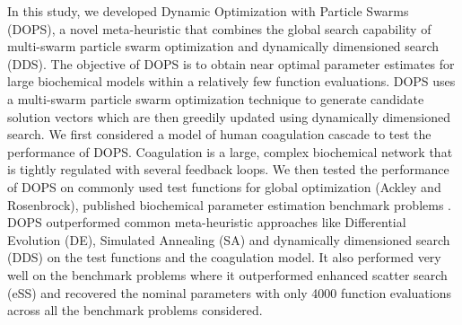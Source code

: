 \documentclass[12pt]{article}
\begin{document}
In this study, we developed Dynamic Optimization with Particle Swarms (DOPS), a novel meta-heuristic that combines the global search capability of multi-swarm particle swarm optimization and dynamically dimensioned search (DDS). The objective of DOPS is to obtain near optimal parameter estimates for large biochemical models within a relatively few function evaluations. DOPS uses a multi-swarm particle swarm optimization technique to generate candidate solution vectors which are then greedily updated using dynamically dimensioned search. We first considered a model of human  coagulation cascade to test the performance of DOPS. Coagulation is a large, complex biochemical network that is tightly regulated with several feedback loops.  We then tested the performance of DOPS on commonly used test functions for global optimization (Ackley and Rosenbrock), published biochemical parameter estimation benchmark problems \cite{villaverde2015biopredyn}. DOPS outperformed common meta-heuristic approaches like Differential Evolution (DE), Simulated Annealing (SA) and dynamically dimensioned search (DDS) on the test functions and the coagulation model. It also performed very well on the benchmark problems where it outperformed enhanced scatter search (eSS) and recovered the nominal parameters with only 4000 function evaluations across all the benchmark problems considered.

\end{document}
